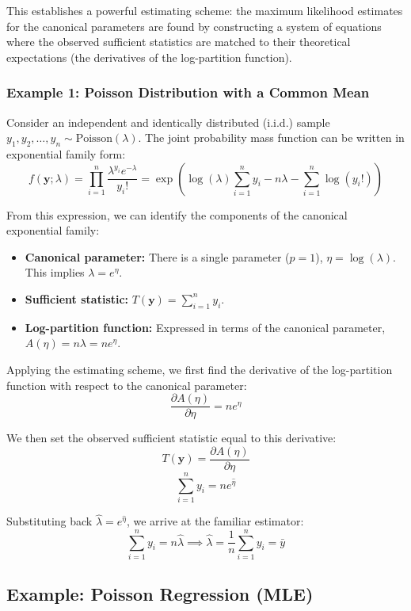 \documentclass[
  letterpaper,
  DIV=11,
  numbers=noendperiod]{scrreprt}
\providecommand{\tightlist}{%
  \setlength{\itemsep}{0pt}\setlength{\parskip}{0pt}}
\renewcommand{\[}{\begin{equation}}
\renewcommand{\]}{\end{equation}}
\theoremstyle{definition}
\theoremstyle{plain}
\theoremstyle{plain}
\theoremstyle{plain}
\theoremstyle{definition}
\theoremstyle{plain}
\theoremstyle{remark}
\begin{document}
This establishes a powerful estimating scheme: the maximum likelihood
estimates for the canonical parameters are found by constructing a
system of equations where the observed sufficient statistics are matched
to their theoretical expectations (the derivatives of the log-partition
function).

\subsubsection{Example 1: Poisson Distribution with a Common
Mean}\label{example-1-poisson-distribution-with-a-common-mean}

Consider an independent and identically distributed (i.i.d.) sample
\(y_1, y_2, \dots, y_n \sim \text{Poisson}(\lambda)\). The joint
probability mass function can be written in exponential family form: \[
f(\mathbf{y}; \lambda) = \prod_{i=1}^n \frac{\lambda^{y_i} e^{-\lambda}}{y_i!} = \exp\left( \log(\lambda) \sum_{i=1}^n y_i - n\lambda - \sum_{i=1}^n \log(y_i!) \right)
\]

From this expression, we can identify the components of the canonical
exponential family:

\begin{itemize}
\tightlist
\item
  \textbf{Canonical parameter:} There is a single parameter (\(p=1\)),
  \(\eta = \log(\lambda)\). This implies \(\lambda = e^\eta\).
\item
  \textbf{Sufficient statistic:} \(T(\mathbf{y}) = \sum_{i=1}^n y_i\).
\item
  \textbf{Log-partition function:} Expressed in terms of the canonical
  parameter, \(A(\eta) = n\lambda = n e^\eta\).
\end{itemize}

Applying the estimating scheme, we first find the derivative of the
log-partition function with respect to the canonical parameter: \[
\frac{\partial A(\eta)}{\partial \eta} = n e^\eta
\]

We then set the observed sufficient statistic equal to this derivative:
\[
T(\mathbf{y}) = \frac{\partial A(\eta)}{\partial \eta}
\] \[
\sum_{i=1}^n y_i = n e^{\hat{\eta}}
\]

Substituting back \(\hat{\lambda} = e^{\hat{\eta}}\), we arrive at the
familiar estimator: \[
\sum_{i=1}^n y_i = n \hat{\lambda} \implies \hat{\lambda} = \frac{1}{n}\sum_{i=1}^n y_i = \bar{y}
\]

\subsection{Example: Poisson Regression
(MLE)}\label{example-poisson-regression-mle}
\end{document}
